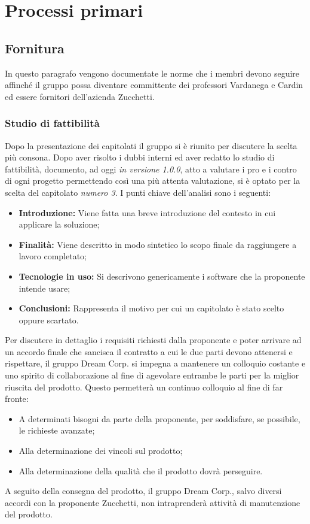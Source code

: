 \section{Processi primari}
    \subsection{Fornitura}
    	In questo paragrafo vengono documentate le norme che i membri devono seguire affinché il gruppo possa diventare committente dei professori Vardanega e Cardin ed essere fornitori dell'azienda Zucchetti\pedice.
    \subsubsection{Studio di fattibilità}
        Dopo la presentazione dei capitolati il gruppo si è riunito per discutere la scelta più consona. Dopo aver risolto i dubbi interni ed aver redatto lo studio di fattibilità, documento, ad oggi \textit{in versione 1.0.0},  atto a valutare i pro e i contro di ogni progetto permettendo così una più attenta valutazione, si è optato per la scelta del capitolato \textit{numero 3}.  \newline
        I punti chiave dell'analisi sono i seguenti:
    	\begin{itemize}
		   \item \textbf{Introduzione:} Viene fatta una breve introduzione del contesto in cui applicare la soluzione;
		   \item \textbf{Finalità:} Viene descritto in modo sintetico lo scopo finale da raggiungere a lavoro completato;
		   \item \textbf{Tecnologie in uso:} Si descrivono genericamente i software che la proponente intende usare;
		   \item \textbf{Conclusioni:} Rappresenta il motivo per cui un capitolato è stato scelto oppure scartato.
	    \end{itemize}
	    Per  discutere  in  dettaglio  i  requisiti  richiesti  dalla  proponente  e  poter  arrivare ad un accordo finale che sancisca il contratto a cui le due parti devono attenersi e rispettare,  il gruppo Dream Corp. si impegna a mantenere un colloquio costante e uno spirito di collaborazione al fine di agevolare entrambe le parti per la miglior riuscita del prodotto.  Questo permetterà un continuo colloquio al fine di far fronte:
	    \begin{itemize}
	        \item A determinati bisogni da parte della proponente, per soddisfare, se possibile, le richieste avanzate;
	        \item Alla determinazione dei vincoli sul prodotto;
	        \item Alla determinazione della qualità che il prodotto dovrà perseguire.
	    \end{itemize}
	    A seguito della consegna del prodotto, il gruppo Dream Corp., salvo diversi accordi con la proponente Zucchetti, non intraprenderà attività di manutenzione del prodotto.
	    
